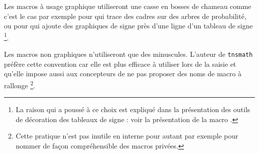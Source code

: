 \documentclass[12pt,a4paper]{book}
\begin{document}
Les macros à usage graphique utiliseront une casse en bosses de chameau comme c'est le cas par exemple
pour  qui trace des cadres sur des arbres de probabilité,
ou pour  qui ajoute des graphiques de signe près d'une ligne d'un tableau de signe
\footnote{
	La raison qui a poussé à ce choix est expliqué dans la présentation des outils de décoration des tableaux de signe : voir la présentation de la macro .
}.

\medskip

Les macros non graphiques n'utiliseront que des minuscules. L'auteur de \verb#tnsmath# préfère cette convention car elle est plus efficace à utiliser lors de la saisie et qu'elle impose aussi aux concepteurs de ne pas proposer des noms de macro à rallonge
\footnote{
	Cette pratique n'est pas inutile en interne pour autant par exemple pour nommer de façon compréhensible des macros privées.
}.
\end{document}
